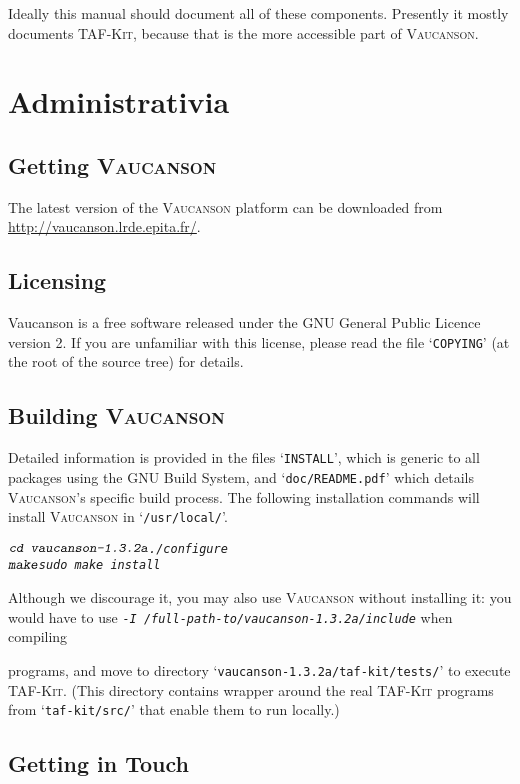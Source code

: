 \documentclass[a4paper]{report}
\makeatletter
\newcommand{\Cxx}{%
  \valign{\vfil\hbox{##}\vfil\cr
    {C\kern-.1em}\cr
    $\hbox{\fontsize\sf@size\z@\textbf{+\kern-0.05em+}}$\cr}%
    \xspace
}
\newenvironment{shell}
{\begin{alltt}}
{\end{alltt}}
\def\VcsnVersion{1.3.2a}
\newcommand\kbd[1]{\textsl{\texttt{#1}}}
\newcommand\file[1]{`\texttt{#1}'}
\newcommand{\tafkit}{\textsc{TAF-Kit}\xspace}
\newcommand{\Vauc}{\textsc{Vaucanson}\xspace}
\makeatother
\begin{document}
Ideally this manual should document all of these components.
Presently it mostly documents \tafkit, because that is the more
accessible part of \Vauc.


\chapter{Administrativia}

\section{Getting \Vauc}

The latest version of the \Vauc platform can be downloaded from
\url{http://vaucanson.lrde.epita.fr/}.

\section{Licensing}

Vaucanson is a free software released under the GNU General Public
Licence version 2. If you are unfamiliar with this license, please
read the file \file{COPYING} (at the root of the source tree) for
details.

\section{Building \Vauc}\label{sec:building}

Detailed information is provided in the files \file{INSTALL}, which is
generic to all packages using the GNU Build System, and
\file{doc/README.pdf} which details \Vauc's specific build process.
The following installation commands will install \Vauc in
\file{/usr/local/}.

\begin{shell}
$ \kbd{cd vaucanson-\VcsnVersion}
$ \kbd{./configure}
$ \kbd{make}
$ \kbd{sudo make install}
\end{shell}

Although we discourage it, you may also use \Vauc without installing
it: you would have to use \kbd{-I
  /full-path-to/vaucanson-\VcsnVersion/include} when compiling \Cxx
programs, and move to directory
\file{vaucanson-\VcsnVersion/taf-kit/tests/} to execute \tafkit.
(This directory contains wrapper around the real \tafkit programs from
\file{taf-kit/src/} that enable them to run locally.)

\section{Getting in Touch}
\end{document}
